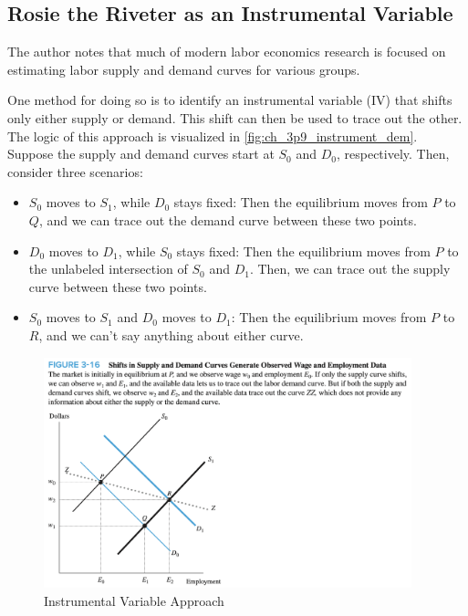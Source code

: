 \FloatBarrier


\subsection{Rosie the Riveter as an Instrumental Variable}

The author notes that much of modern 
labor economics research is focused on 
estimating labor supply and demand curves for 
various groups.

One method for doing so is to identify an 
instrumental variable (IV) that shifts
only either supply or demand.
This shift can then be used to trace out 
the other. The logic of this 
approach is visualized in 
\autoref{fig:ch_3p9_instrument_dem}.
Suppose the supply and demand 
curves start at $S_0$ and $D_0$, respectively.
Then, consider three scenarios:

\begin{itemize}
    \item $S_0$ moves to $S_1$, while $D_0$ stays fixed: Then 
        the equilibrium moves from $P$ to $Q$, and we can 
        trace out the demand curve between these two points.
    \item $D_0$ moves to $D_1$, while $S_0$ stays fixed: Then 
        the equilibrium moves from $P$ to the unlabeled 
        intersection of $S_0$ and $D_1$. 
        Then, we can trace out the supply curve between 
        these two points.
    \item $S_0$ moves to $S_1$ and $D_0$ moves to $D_1$: Then 
        the equilibrium moves from $P$ to $R$, and we can't 
        say anything about either curve.
\end{itemize}


\FloatBarrier

\begin{figure}[!htb]
    \centering
        \includegraphics[width=0.95\textwidth]{../input/ch_3p9_instrument_dem.png}
    \caption{Instrumental Variable Approach}
    \label{fig:ch_3p9_instrument_dem}
\end{figure}

